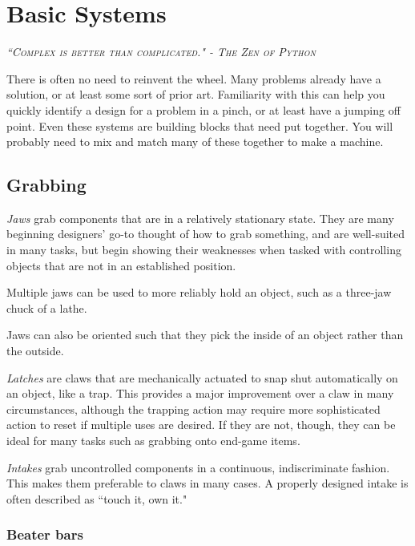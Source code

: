 
\chapter{Basic Systems}

 {\slshape \scshape ``Complex is better than complicated." - The Zen of Python}
 
 There is often no need to reinvent the wheel. Many problems already have a solution, or at least some sort of prior art. Familiarity with this can help you quickly identify a design for a problem in a pinch, or at least have a jumping off point. Even these systems are building blocks that need put together. You will probably need to mix and match many of these together to make a machine.

\section{Grabbing} \label{sec:intakes}

\textit{Jaws} grab components that are in a relatively stationary state. They are many beginning designers' go-to thought of how to grab something, and are well-suited in many tasks, but begin showing their weaknesses when tasked with controlling objects that are not in an established position.

Multiple jaws can be used to more reliably hold an object, such as a three-jaw chuck of a lathe.

Jaws can also be oriented such that they pick the inside of an object rather than the outside.

\textit{Latches} are claws that are mechanically actuated to snap shut automatically on an object, like a trap. This provides a major improvement over a claw in many circumstances, although the trapping action may require more sophisticated action to reset if multiple uses are desired. If they are not, though, they can be ideal for many tasks such as grabbing onto end-game items.

\textit{Intakes} grab uncontrolled components in a continuous, indiscriminate fashion. This makes them preferable to claws in many cases. A properly designed intake is often described as ``touch it, own it."

\subsection{Beater bars} 


